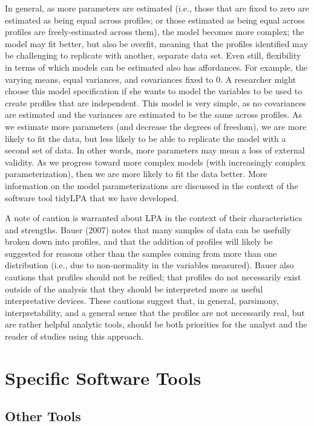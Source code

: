 \documentclass[
  english,
  man]{apa6}
\begin{document}
In general, as more parameters are estimated (i.e., those that are fixed to zero
are estimated as being equal across profiles; or those estimated as being equal
across profiles are freely-estimated across them), the model becomes more
complex; the model may fit better, but also be overfit, meaning that the
profiles identified may be challenging to replicate with another, separate data
set. Even still, flexibility in terms of which models can be estimated also has
affordances. For example, the varying means, equal variances, and covariances
fixed to 0. A researcher might choose this model specification if she wants to
model the variables to be used to create profiles that are independent. This
model is very simple, as no covariances are estimated and the variances are
estimated to be the same across profiles. As we estimate more parameters (and
decrease the degrees of freedom), we are more likely to fit the data, but less
likely to be able to replicate the model with a second set of data. In other
words, more parameters may mean a loss of external validity. As we progress
toward more complex models (with increasingly complex parameterization), then we
are more likely to fit the data better. More information on the model
parameterizations are discussed in the context of the software tool tidyLPA that
we have developed.

A note of caution is warranted about LPA in the context of their characteristics
and strengths. Bauer (2007) notes that many samples of data can be usefully
broken down into profiles, and that the addition of profiles will likely be
suggested for reasons other than the samples coming from more than one
distribution (i.e., due to non-normality in the variables measured). Bauer also
cautions that profiles should not be reified; that profiles do not necessarily
exist outside of the analysis that they should be interpreted more as useful
interpretative devices. These cautions suggest that, in general, parsimony,
interpretability, and a general sense that the profiles are not necessarily
real, but are rather helpful analytic tools, should be both priorities for the
analyst and the reader of studies using this approach.

\hypertarget{specific-software-tools}{%
\section{Specific Software Tools}\label{specific-software-tools}}

\hypertarget{other-tools}{%
\subsection{Other Tools}\label{other-tools}}
\end{document}

